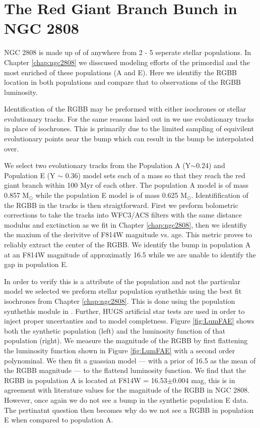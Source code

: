 \section{The Red Giant Branch Bunch in NGC 2808}
NGC 2808 is made up of of anywhere from 2 - 5 seperate stellar populations. In
Chapter \ref{chap:ngc2808} we disscused modeling efforts of the primordial
and the most enriched of these populations (A and E). Here we identifiy the
RGBB location in both populations and compare that to observations of the RGBB
luminosity.

Identification of the RGBB may be preformed with either isochrones or stellar
evolutionary tracks. For the same reasons laied out in \citet{Joyce2016} we use
evolutionary tracks in place of isochrones. This is primarily due to the
limited sampling of equivilent evolutionary points near the bump which can
result in the bump be interpolated over. 

We select two evolutionary tracks from the Population A (Y$\sim$0.24) and
Population E (Y $\sim$ 0.36) model sets each of a mass so that they reach the
red giant branch within 100 Myr of each other. The population A model is of
mass 0.857 M$_{\odot}$ while the population E model is of mass 0.625
M$_{\odot}$. Identifification of the RGBB in the tracks is then straigtforward.
First we preform bolometric corrections to take the tracks into WFC3/ACS
filters with the same distance modulus and exctinction as we fit in Chapter
\ref{chap:ngc2808}, then we identifiy the maxium of the derivitve of F814W
magnitude vs. age. This metric proves to reliably extract the center of the
RGBB. We identify the bump in population A at an F814W magnitude of approximatly 16.5 while
we are unable to identify the gap in population E.

In order to verify this is a attribute of the population and not the particular
model we selected we preform stellar population synthethis using the best fit
isochrones from Chapter \ref{chap:ngc2808}. This is done using the population
synthethis module in \fidanka. Further, HUGS artificial star tests are used in
order to inject proper uncertanties and to model completness. Figure
\ref{fig:LumFAE} shows both the synthetic population (left) and the luminosity
function of that population (right). We measure the magnitude of the RGBB by
first flattening the luminosity function shown in Figure \ref{fig:LumFAE} with
a second order polynominal. We then fit a guassian model --- with a prior of
16.5 as the mean of the RGBB magnitude --- to the flattend luminosity function.
We find that the RGBB in population A is located at F814W = 16.53$\pm$0.004
mag, this is in agreement with literature values for the magnitude of the RGBB
in NGC 2808. However, once again we do not see a bump in the synthetic
population E data. The pertinatnt question then becomes why do we not see a
RGBB in population E when compared to population A.


